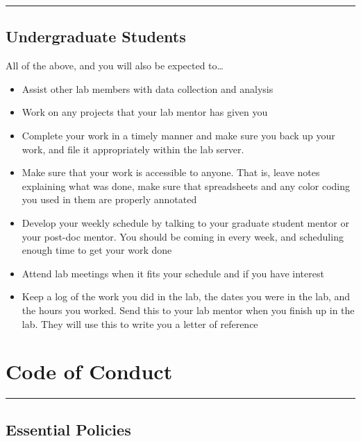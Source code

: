 \documentclass[]{book}
\providecommand{\tightlist}{%
  \setlength{\itemsep}{0pt}\setlength{\parskip}{0pt}}
\begin{document}
\begin{center}\rule{0.5\linewidth}{\linethickness}\end{center}

\hypertarget{undergraduate-students}{%
\section{Undergraduate Students}\label{undergraduate-students}}

All of the above, and you will also be expected to\ldots{}

\begin{itemize}
\tightlist
\item
  Assist other lab members with data collection and analysis
\item
  Work on any projects that your lab mentor has given you
\item
  Complete your work in a timely manner and make sure you back up your work, and file it appropriately within the lab server.
\item
  Make sure that your work is accessible to anyone. That is, leave notes explaining what was done, make sure that spreadsheets and any color coding you used in them are properly annotated
\item
  Develop your weekly schedule by talking to your graduate student mentor or your post-doc mentor. You should be coming in every week, and scheduling enough time to get your work done
\item
  Attend lab meetings when it fits your schedule and if you have interest
\item
  Keep a log of the work you did in the lab, the dates you were in the lab, and the hours you worked. Send this to your lab mentor when you finish up in the lab. They will use this to write you a letter of reference
\end{itemize}

\hypertarget{code-of-conduct}{%
\chapter{Code of Conduct}\label{code-of-conduct}}

\begin{center}\rule{0.5\linewidth}{\linethickness}\end{center}

\hypertarget{essential-policies}{%
\section{Essential Policies}\label{essential-policies}}
\end{document}
